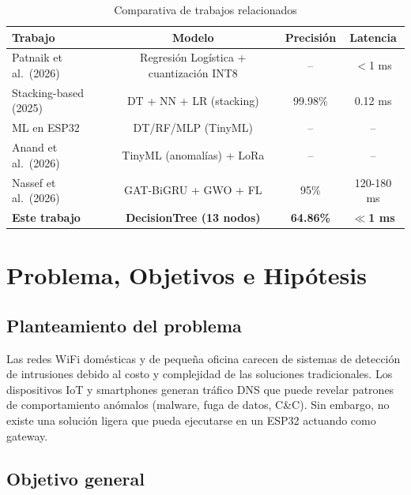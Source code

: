 \documentclass[12pt,a4paper]{article}
\begin{document}
\begin{table}[H]
\centering
\caption{Comparativa de trabajos relacionados}
\label{tab:estado}
\small
\begin{tabularx}{\textwidth}{Xccc}
\toprule
\textbf{Trabajo} & \textbf{Modelo} & \textbf{Precisión} & \textbf{Latencia} \\
\midrule
Patnaik et al.~(2026) & Regresión Logística + cuantización INT8 & -- & $<$1 ms \\
Stacking-based (2025) & DT + NN + LR (stacking) & 99.98\% & 0.12 ms \\
ML en ESP32 & DT/RF/MLP (TinyML) & -- & -- \\
Anand et al.~(2026) & TinyML (anomalías) + LoRa & -- & -- \\
Nassef et al.~(2026) & GAT-BiGRU + GWO + FL & 95\% & 120-180 ms \\
\midrule
\textbf{Este trabajo} & \textbf{DecisionTree (13 nodos)} & \textbf{64.86\%} & \textbf{$\ll$1 ms} \\
\bottomrule
\end{tabularx}
\end{table}

\section{Problema, Objetivos e Hipótesis}
\label{sec:problema}

\subsection{Planteamiento del problema}
\label{sec:problema-planteamiento}

Las redes WiFi domésticas y de pequeña oficina carecen de sistemas de detección de intrusiones debido al costo y complejidad de las soluciones tradicionales. Los dispositivos IoT y smartphones generan tráfico DNS que puede revelar patrones de comportamiento anómalos (malware, fuga de datos, C\&C). Sin embargo, no existe una solución ligera que pueda ejecutarse en un ESP32 actuando como gateway.

\subsection{Objetivo general}
\label{sec:objetivo-general}
\end{document}
